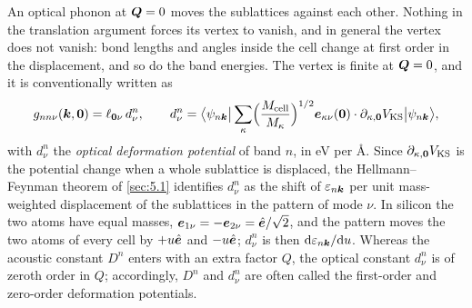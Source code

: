 An optical phonon at $\bm{Q} = 0$ moves the sublattices against each other. Nothing in the translation argument forces its vertex to vanish, and in general the vertex does not vanish: bond lengths and angles inside the cell change at first order in the displacement, and so do the band energies. The vertex is finite at $\bm{Q} = 0$, and it is conventionally written as
\begin{equation}
  g_{nn\nu}(\bm{k},\bm{0}) = \ell_{\bm{0}\nu}\,d^n_\nu , \qquad
  d^n_\nu = \bigl\langle\psi_{n\bm{k}}\bigr|\sum_{\kappa}\Bigl(\frac{M_{\mathrm{cell}}}{M_\kappa}\Bigr)^{1/2}\bm{e}_{\kappa\nu}(\bm{0})\cdot\partial_{\kappa,\bm{0}}V_{\mathrm{KS}}\bigl|\psi_{n\bm{k}}\bigr\rangle ,
  \label{eq:6.2-d}
\end{equation}
with $d^n_\nu$ the \emph{optical deformation potential} of band $n$, in eV per \si{\angstrom}. Since $\partial_{\kappa,\bm{0}}V_{\mathrm{KS}}$ is the potential change when a whole sublattice is displaced, the Hellmann--Feynman theorem of \cref{sec:5.1} identifies $d^n_\nu$ as the shift of $\varepsilon_{n\bm{k}}$ per unit mass-weighted displacement of the sublattices in the pattern of mode $\nu$. In silicon the two atoms have equal masses, $\bm{e}_{1\nu} = -\bm{e}_{2\nu} = \hat{\bm{e}}/\sqrt2$, and the pattern moves the two atoms of every cell by $+u\hat{\bm{e}}$ and $-u\hat{\bm{e}}$; $d^n_\nu$ is then $\mathrm{d}\varepsilon_{n\bm{k}}/\mathrm{d} u$. Whereas the acoustic constant $D^n$ enters with an extra factor $Q$, the optical constant $d^n_\nu$ is of zeroth order in $Q$; accordingly, $D^n$ and $d^n_\nu$ are often called the first-order and zero-order deformation potentials.

